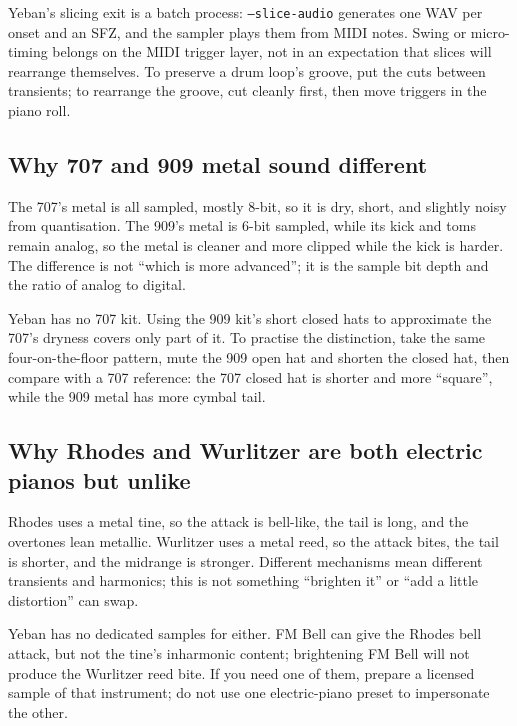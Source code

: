 Yeban's slicing exit is a batch process: \texttt{--slice-audio} generates
one WAV per onset and an SFZ, and the sampler plays them from MIDI notes.
Swing or micro-timing belongs on the MIDI trigger layer, not in an expectation
that slices will rearrange themselves. To preserve a drum loop's groove, put
the cuts between transients; to rearrange the groove, cut cleanly first, then
move triggers in the piano roll.

\subsection{Why 707 and 909 metal sound different}
\label{sec:iconic-why-707-909}

The 707's metal is all sampled, mostly 8-bit, so it is dry, short, and
slightly noisy from quantisation. The 909's metal is 6-bit sampled, while its
kick and toms remain analog, so the metal is cleaner and more clipped while
the kick is harder. The difference is not ``which is more advanced''; it is
the sample bit depth and the ratio of analog to digital.

Yeban has no 707 kit. Using the 909 kit's short closed hats to approximate the
707's dryness covers only part of it. To practise the distinction, take the
same four-on-the-floor pattern, mute the 909 open hat and shorten the closed
hat, then compare with a 707 reference: the 707 closed hat is shorter and more
``square'', while the 909 metal has more cymbal tail.

\subsection{Why Rhodes and Wurlitzer are both electric pianos but unlike}
\label{sec:iconic-why-rhodes-wurli}

Rhodes uses a metal tine, so the attack is bell-like, the tail is long, and
the overtones lean metallic. Wurlitzer uses a metal reed, so the attack bites,
the tail is shorter, and the midrange is stronger. Different mechanisms mean
different transients and harmonics; this is not something ``brighten it'' or
``add a little distortion'' can swap.

Yeban has no dedicated samples for either. FM Bell can give the Rhodes bell
attack, but not the tine's inharmonic content; brightening FM Bell will not
produce the Wurlitzer reed bite. If you need one of them, prepare a licensed
sample of that instrument; do not use one electric-piano preset to impersonate
the other.

